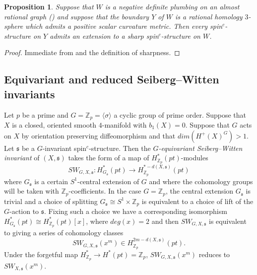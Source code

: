 \documentclass{amsart}
\newtheorem{proposition}[theorem]{Proposition}
\theoremstyle{definition}
\theoremstyle{remark}
\numberwithin{equation}{section}
\begin{document}
\begin{proposition}
Suppose that $W$ is a negative definite plumbing on an almost rational graph (\cite[Definition 8.1]{nem}) and suppose that the boundary $Y$ of $W$ is a rational homology $3$-sphere which admits a positive scalar curvature metric. Then every spin$^c$-structure on $Y$ admits an extension to a sharp spin$^c$-structure on $W$.
\end{proposition}
\begin{proof}
Immediate from \cite[Theorem 8.3]{nem} and the definition of sharpness.
\end{proof}

\subsection{Equivariant and reduced Seiberg--Witten invariants}\label{sec:eqred}

Let $p$ be a prime and $G = \mathbb{Z}_p = \langle \sigma \rangle$ a cyclic group of prime order. Suppose that $X$ is a closed, oriented smooth $4$-manifold with $b_1(X) = 0$. Suppose that $G$ acts on $X$ by orientation preserving diffeomorphism and that $dim( H^+(X)^G ) > 1$. Let $\mathfrak{s}$ be a $G$-invariant spin$^c$-structure. Then the {\em $G$-equivariant Seiberg--Witten invariant} of $(X , \mathfrak{s})$ takes the form of a map of $H^*_{\mathbb{Z}_p}(pt)$-modules
\[
SW_{G , X , \mathfrak{s}} : H^*_{G_{\mathfrak{s}}}(pt) \to H^{* - d(X,\mathfrak{s})}_{\mathbb{Z}_p}(pt)
\]
where $G_{\mathfrak{s}}$ is a certain $S^1$-central extension of $G$ and where the cohomology groups will be taken with $\mathbb{Z}_p$-coefficients. In the case $G = \mathbb{Z}_p$, the central extension $G_{\mathfrak{s}}$ is trivial and a choice of splitting $G_{\mathfrak{s}} \cong S^1 \times \mathbb{Z}_p$ is equivalent to a choice of lift of the $G$-action to $\mathfrak{s}$. Fixing such a choice we have a corresponding isomorphism $H^*_{G_{\mathfrak{s}}}(pt) \cong H^*_{\mathbb{Z}_p}(pt)[x]$, where $deg(x) = 2$ and then $SW_{G , X , \mathfrak{s}}$ is equivalent to giving a series of cohomology classes
\[
SW_{G , X , \mathfrak{s}}(x^m) \in H^{2m-d(X,\mathfrak{s})}_{\mathbb{Z}_p}(pt).
\]
Under the forgetful map $H^*_{\mathbb{Z}_p} \to H^*(pt) = \mathbb{Z}_p$, $SW_{G , X , \mathfrak{s}}(x^m)$ reduces to $SW_{X , \mathfrak{s}}(x^m)$.
\end{document}
